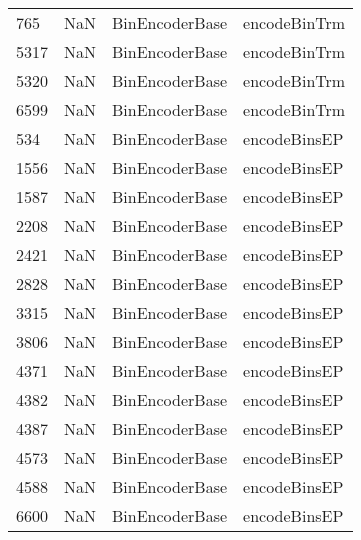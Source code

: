 \begin{tabular}{llll}
765  &                   NaN &             BinEncoderBase &                              encodeBinTrm \\
5317 &                   NaN &             BinEncoderBase &                              encodeBinTrm \\
5320 &                   NaN &             BinEncoderBase &                              encodeBinTrm \\
6599 &                   NaN &             BinEncoderBase &                              encodeBinTrm \\
534  &                   NaN &             BinEncoderBase &                              encodeBinsEP \\
1556 &                   NaN &             BinEncoderBase &                              encodeBinsEP \\
1587 &                   NaN &             BinEncoderBase &                              encodeBinsEP \\
2208 &                   NaN &             BinEncoderBase &                              encodeBinsEP \\
2421 &                   NaN &             BinEncoderBase &                              encodeBinsEP \\
2828 &                   NaN &             BinEncoderBase &                              encodeBinsEP \\
3315 &                   NaN &             BinEncoderBase &                              encodeBinsEP \\
3806 &                   NaN &             BinEncoderBase &                              encodeBinsEP \\
4371 &                   NaN &             BinEncoderBase &                              encodeBinsEP \\
4382 &                   NaN &             BinEncoderBase &                              encodeBinsEP \\
4387 &                   NaN &             BinEncoderBase &                              encodeBinsEP \\
4573 &                   NaN &             BinEncoderBase &                              encodeBinsEP \\
4588 &                   NaN &             BinEncoderBase &                              encodeBinsEP \\
6600 &                   NaN &             BinEncoderBase &                              encodeBinsEP \\

\end{tabular}
